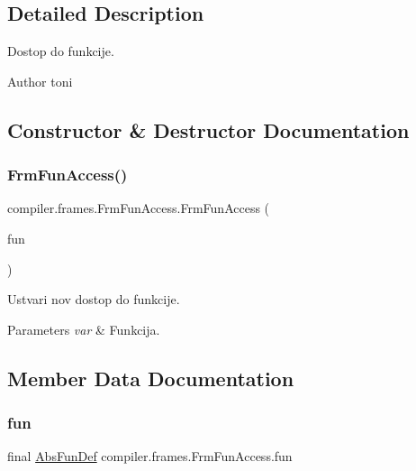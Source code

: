 \subsection{Detailed Description}
Dostop do funkcije.

\begin{DoxyAuthor}{Author}
toni 
\end{DoxyAuthor}


\subsection{Constructor \& Destructor Documentation}
\mbox{\label{classcompiler_1_1frames_1_1_frm_fun_access_a741f17a16beb71bae8bc89cd15bf8ea4}} 
\subsubsection{\texorpdfstring{Frm\+Fun\+Access()}{FrmFunAccess()}}
{\footnotesize\ttfamily compiler.\+frames.\+Frm\+Fun\+Access.\+Frm\+Fun\+Access (\begin{DoxyParamCaption}\item[{\hyperlink{classcompiler_1_1abstr_1_1tree_1_1def_1_1_abs_fun_def}{Abs\+Fun\+Def}}]{fun }\end{DoxyParamCaption})}

Ustvari nov dostop do funkcije.


\begin{DoxyParams}{Parameters}
{\em var} & Funkcija. \\
\hline
\end{DoxyParams}


\subsection{Member Data Documentation}
\mbox{\label{classcompiler_1_1frames_1_1_frm_fun_access_af2723e31d9937f6afd8b1ae64e54c0a3}} 
\subsubsection{\texorpdfstring{fun}{fun}}
{\footnotesize\ttfamily final \hyperlink{classcompiler_1_1abstr_1_1tree_1_1def_1_1_abs_fun_def}{Abs\+Fun\+Def} compiler.\+frames.\+Frm\+Fun\+Access.\+fun}

